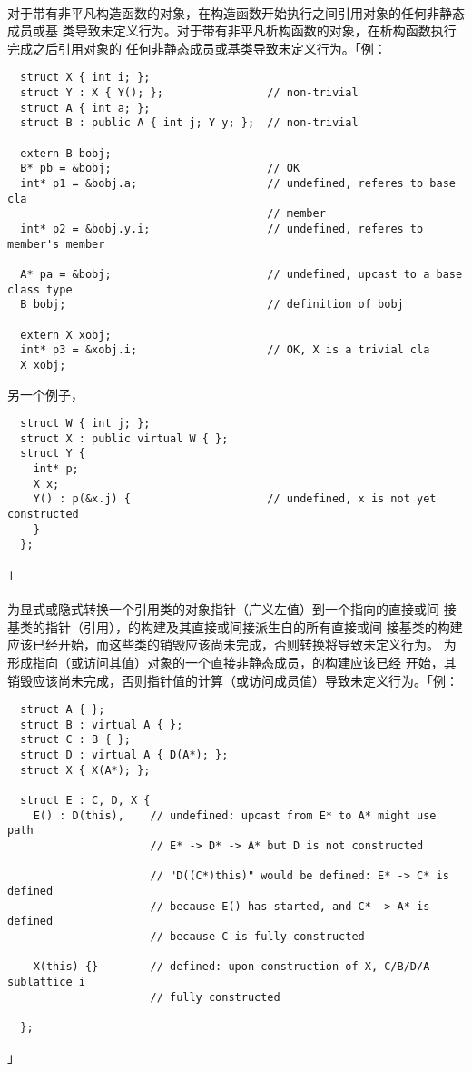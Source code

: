 \paragraph{}
对于带有非平凡构造函数的对象，在构造函数开始执行之间引用对象的任何非静态成员或基
类导致未定义行为。对于带有非平凡析构函数的对象，在析构函数执行完成之后引用对象的
任何非静态成员或基类导致未定义行为。「例：
\begin{lstlisting}
  struct X { int i; };
  struct Y : X { Y(); };                // non-trivial
  struct A { int a; };
  struct B : public A { int j; Y y; };  // non-trivial

  extern B bobj;
  B* pb = &bobj;                        // OK
  int* p1 = &bobj.a;                    // undefined, referes to base cla
                                        // member
  int* p2 = &bobj.y.i;                  // undefined, referes to member's member

  A* pa = &bobj;                        // undefined, upcast to a base class type
  B bobj;                               // definition of bobj

  extern X xobj;
  int* p3 = &xobj.i;                    // OK, X is a trivial cla
  X xobj;
\end{lstlisting}
另一个例子，
\begin{lstlisting}
  struct W { int j; };
  struct X : public virtual W { };
  struct Y {
    int* p;
    X x;
    Y() : p(&x.j) {                     // undefined, x is not yet constructed
    }
  };
\end{lstlisting}」

\paragraph{}
为显式或隐式转换一个引用类的对象指针（广义左值）到一个指向的直接或间
接基类的指针（引用），的构建及其直接或间接派生自的所有直接或间
接基类的构建应该已经开始，而这些类的销毁应该尚未完成，否则转换将导致未定义行为。
为形成指向（或访问其值）对象的一个直接非静态成员，的构建应该已经
开始，其销毁应该尚未完成，否则指针值的计算（或访问成员值）导致未定义行为。「例：
\begin{lstlisting}
  struct A { };
  struct B : virtual A { };
  struct C : B { };
  struct D : virtual A { D(A*); };
  struct X { X(A*); };

  struct E : C, D, X {
    E() : D(this),    // undefined: upcast from E* to A* might use path
                      // E* -> D* -> A* but D is not constructed

                      // "D((C*)this)" would be defined: E* -> C* is defined
                      // because E() has started, and C* -> A* is defined
                      // because C is fully constructed

    X(this) {}        // defined: upon construction of X, C/B/D/A sublattice i
                      // fully constructed

  };
\end{lstlisting}」

